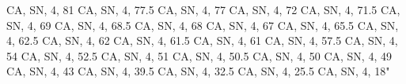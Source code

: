 \documentclass[
]{book}
\newenvironment{Shaded}{\begin{snugshade}}{\end{snugshade}}
\newcommand{\StringTok}[1]{\textcolor[rgb]{0.31,0.60,0.02}{#1}}
\begin{document}
\begin{Shaded}
\begin{Highlighting}[]
\StringTok{ \textquotesingle{}CA\textquotesingle{}, \textquotesingle{}SN\textquotesingle{}, 4, 81}
\StringTok{ \textquotesingle{}CA\textquotesingle{}, \textquotesingle{}SN\textquotesingle{}, 4, 77.5}
\StringTok{ \textquotesingle{}CA\textquotesingle{}, \textquotesingle{}SN\textquotesingle{}, 4, 77}
\StringTok{ \textquotesingle{}CA\textquotesingle{}, \textquotesingle{}SN\textquotesingle{}, 4, 72}
\StringTok{ \textquotesingle{}CA\textquotesingle{}, \textquotesingle{}SN\textquotesingle{}, 4, 71.5}
\StringTok{ \textquotesingle{}CA\textquotesingle{}, \textquotesingle{}SN\textquotesingle{}, 4, 69}
\StringTok{ \textquotesingle{}CA\textquotesingle{}, \textquotesingle{}SN\textquotesingle{}, 4, 68.5}
\StringTok{ \textquotesingle{}CA\textquotesingle{}, \textquotesingle{}SN\textquotesingle{}, 4, 68}
\StringTok{ \textquotesingle{}CA\textquotesingle{}, \textquotesingle{}SN\textquotesingle{}, 4, 67}
\StringTok{ \textquotesingle{}CA\textquotesingle{}, \textquotesingle{}SN\textquotesingle{}, 4, 65.5}
\StringTok{ \textquotesingle{}CA\textquotesingle{}, \textquotesingle{}SN\textquotesingle{}, 4, 62.5}
\StringTok{ \textquotesingle{}CA\textquotesingle{}, \textquotesingle{}SN\textquotesingle{}, 4, 62}
\StringTok{ \textquotesingle{}CA\textquotesingle{}, \textquotesingle{}SN\textquotesingle{}, 4, 61.5}
\StringTok{ \textquotesingle{}CA\textquotesingle{}, \textquotesingle{}SN\textquotesingle{}, 4, 61}
\StringTok{ \textquotesingle{}CA\textquotesingle{}, \textquotesingle{}SN\textquotesingle{}, 4, 57.5}
\StringTok{ \textquotesingle{}CA\textquotesingle{}, \textquotesingle{}SN\textquotesingle{}, 4, 54}
\StringTok{ \textquotesingle{}CA\textquotesingle{}, \textquotesingle{}SN\textquotesingle{}, 4, 52.5}
\StringTok{ \textquotesingle{}CA\textquotesingle{}, \textquotesingle{}SN\textquotesingle{}, 4, 51}
\StringTok{ \textquotesingle{}CA\textquotesingle{}, \textquotesingle{}SN\textquotesingle{}, 4, 50.5}
\StringTok{ \textquotesingle{}CA\textquotesingle{}, \textquotesingle{}SN\textquotesingle{}, 4, 50}
\StringTok{ \textquotesingle{}CA\textquotesingle{}, \textquotesingle{}SN\textquotesingle{}, 4, 49}
\StringTok{ \textquotesingle{}CA\textquotesingle{}, \textquotesingle{}SN\textquotesingle{}, 4, 43}
\StringTok{ \textquotesingle{}CA\textquotesingle{}, \textquotesingle{}SN\textquotesingle{}, 4, 39.5}
\StringTok{ \textquotesingle{}CA\textquotesingle{}, \textquotesingle{}SN\textquotesingle{}, 4, 32.5}
\StringTok{ \textquotesingle{}CA\textquotesingle{}, \textquotesingle{}SN\textquotesingle{}, 4, 25.5}
\StringTok{ \textquotesingle{}CA\textquotesingle{}, \textquotesingle{}SN\textquotesingle{}, 4, 18"}


\end{Highlighting}
\end{Shaded}
\end{document}
